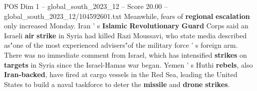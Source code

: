 \begin{textsample}{POS Dim 1 – global\_south\_2023\_12 – Score 20.00 – global\_south\_2023\_12/104592601.txt}
Meanwhile, fears of \textbf{regional} \textbf{escalation} only increased Monday.
Iran ' s \textbf{Islamic} \textbf{Revolutionary} \textbf{Guard} Corps said an Israeli \textbf{air} \textbf{strike} in Syria had killed Razi Moussavi, who state media described as"one of the most experienced advisers"of the military force ' s foreign arm.
There was no immediate comment from Israel, which has intensified \textbf{strikes} on \textbf{targets} in Syria since the Israel-Hamas war began.
Yemen ' s Huthi \textbf{rebels}, also \textbf{Iran-backed}, have fired at cargo vessels in the Red Sea, leading the United States to build a naval taskforce to deter the \textbf{missile} and \textbf{drone} \textbf{strikes}.

\end{textsample}
